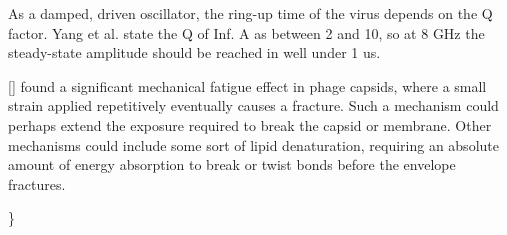 \documentclass[fleqn,10pt]{article}
\begin{document}
\begin{multicols}{1}
As a damped, driven oscillator, the ring-up time of the virus depends on the Q factor. Yang et al. state the Q of Inf. A as between 2 and 10, so at 8 GHz the steady-state amplitude should be reached in well under 1 us. 

[] found a significant mechanical fatigue effect in phage capsids, where a small strain applied repetitively eventually causes a fracture. Such a mechanism could perhaps extend the exposure required to break the capsid or membrane. Other mechanisms could include some sort of lipid denaturation, requiring an absolute amount of energy absorption to break or twist bonds before the envelope fractures.

{\color{red}  \} } 

\end{multicols}



\clearpage
\end{document}
